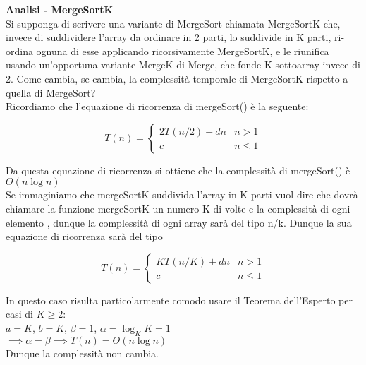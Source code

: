 \documentclass[../cheatSheetAlgoritmi.tex]{subfiles}
\begin{document}
\bigskip
\textbf{Analisi - MergeSortK}\\
Si supponga di scrivere una variante di MergeSort chiamata MergeSortK che, invece di suddividere l’array da ordinare in 2 parti, lo suddivide in K parti, ri-ordina ognuna di esse applicando ricorsivamente MergeSortK, e le riunifica usando un’opportuna variante MergeK di Merge, che fonde K sottoarray invece di 2. Come cambia, se cambia, la complessità temporale di MergeSortK rispetto a quella di MergeSort?\\
Ricordiamo che l'equazione di ricorrenza di mergeSort() è la seguente:
\begin{center}
	\begin{equation*}
  		T(n)=\begin{cases}
			2T(n/2) +  dn & \text{$n > 1$}\\
			c & \text{$n \leq 1$}	
  		\end{cases}
	\end{equation*}
\end{center}
Da questa equazione di ricorrenza si ottiene che la complessità di mergeSort() è $\Theta(n\log{n})$\\
Se immaginiamo che mergeSortK suddivida l'array in K parti vuol dire che dovrà chiamare la funzione mergeSortK un numero K di volte e la complessità di ogni elemento , dunque la complessità di ogni array sarà del tipo n/k. Dunque la sua equazione di ricorrenza sarà del tipo
\begin{center}
	\begin{equation*}
  		T(n)=\begin{cases}
			KT(n/K) +  dn & \text{$n > 1$}\\
			c & \text{$n \leq 1$}	
  		\end{cases}
	\end{equation*}
\end{center}
In questo caso risulta particolarmente comodo usare il Teorema dell'Esperto per casi di $K \geq 2$:\\
$a = K$, $b = K$, $\beta = 1$, $\alpha = \log_{K}{K} = 1$\\
$\implies \alpha = \beta \implies T(n) = \Theta(n\log{n})$\\
Dunque la complessità non cambia.

 
\end{document}
